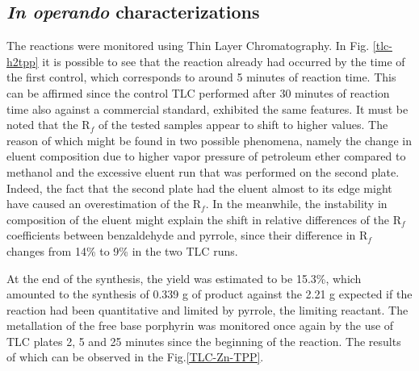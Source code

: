 \documentclass[twoside,twocolumn,9pt]{article}
\begin{document}
\subsection{\textit{In operando} characterizations}
The reactions were monitored using Thin Layer Chromatography.
In Fig. \ref{tlc-h2tpp} it is possible to see that the reaction already had occurred by the time of the first control, which corresponds to around 5 minutes of reaction time.
This can be affirmed since the control TLC performed after 30 minutes of reaction time also against a commercial standard, exhibited the same features.
It must be noted that the R$_{f}$ of the tested samples appear to shift to higher values.
The reason of which might be found in two possible phenomena, namely the change in eluent composition due to higher vapor pressure of petroleum ether compared to methanol and the excessive eluent run that was performed on the second plate.
Indeed, the fact that the second plate had the eluent almost to its edge might have caused an overestimation of the R$_{f}$.
In the meanwhile, the instability in composition of the eluent might explain the shift in relative differences of the R$_{f}$ coefficients between benzaldehyde and pyrrole, since their difference in R$_{f}$ changes from 14\% to 9\% in the two TLC runs.

At the end of the synthesis, the yield was estimated to be 15.3\%, which amounted to the synthesis of 0.339 g of product against the 2.21 g expected if the reaction had been quantitative and limited by pyrrole, the limiting reactant.
The metallation of the free base porphyrin was monitored once again by the use of TLC plates 2, 5 and 25 minutes since the beginning of the reaction.
The results of which can be observed in the Fig.\ref{TLC-Zn-TPP}.\\
\end{document}
